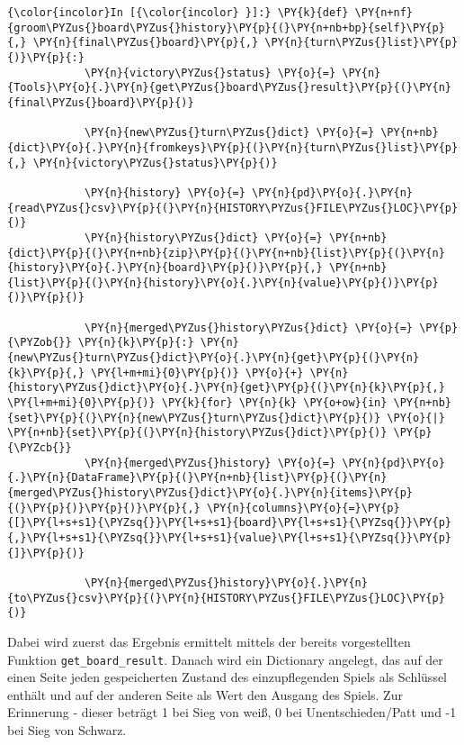     \begin{Verbatim}[commandchars=\\\{\}]
{\color{incolor}In [{\color{incolor} }]:} \PY{k}{def} \PY{n+nf}{groom\PYZus{}board\PYZus{}history}\PY{p}{(}\PY{n+nb+bp}{self}\PY{p}{,} \PY{n}{final\PYZus{}board}\PY{p}{,} \PY{n}{turn\PYZus{}list}\PY{p}{)}\PY{p}{:}
            \PY{n}{victory\PYZus{}status} \PY{o}{=} \PY{n}{Tools}\PY{o}{.}\PY{n}{get\PYZus{}board\PYZus{}result}\PY{p}{(}\PY{n}{final\PYZus{}board}\PY{p}{)}
        
            \PY{n}{new\PYZus{}turn\PYZus{}dict} \PY{o}{=} \PY{n+nb}{dict}\PY{o}{.}\PY{n}{fromkeys}\PY{p}{(}\PY{n}{turn\PYZus{}list}\PY{p}{,} \PY{n}{victory\PYZus{}status}\PY{p}{)}
        
            \PY{n}{history} \PY{o}{=} \PY{n}{pd}\PY{o}{.}\PY{n}{read\PYZus{}csv}\PY{p}{(}\PY{n}{HISTORY\PYZus{}FILE\PYZus{}LOC}\PY{p}{)}
            \PY{n}{history\PYZus{}dict} \PY{o}{=} \PY{n+nb}{dict}\PY{p}{(}\PY{n+nb}{zip}\PY{p}{(}\PY{n+nb}{list}\PY{p}{(}\PY{n}{history}\PY{o}{.}\PY{n}{board}\PY{p}{)}\PY{p}{,} \PY{n+nb}{list}\PY{p}{(}\PY{n}{history}\PY{o}{.}\PY{n}{value}\PY{p}{)}\PY{p}{)}\PY{p}{)}
        
            \PY{n}{merged\PYZus{}history\PYZus{}dict} \PY{o}{=} \PY{p}{\PYZob{}} \PY{n}{k}\PY{p}{:} \PY{n}{new\PYZus{}turn\PYZus{}dict}\PY{o}{.}\PY{n}{get}\PY{p}{(}\PY{n}{k}\PY{p}{,} \PY{l+m+mi}{0}\PY{p}{)} \PY{o}{+} \PY{n}{history\PYZus{}dict}\PY{o}{.}\PY{n}{get}\PY{p}{(}\PY{n}{k}\PY{p}{,} \PY{l+m+mi}{0}\PY{p}{)} \PY{k}{for} \PY{n}{k} \PY{o+ow}{in} \PY{n+nb}{set}\PY{p}{(}\PY{n}{new\PYZus{}turn\PYZus{}dict}\PY{p}{)} \PY{o}{|} \PY{n+nb}{set}\PY{p}{(}\PY{n}{history\PYZus{}dict}\PY{p}{)} \PY{p}{\PYZcb{}}
            \PY{n}{merged\PYZus{}history} \PY{o}{=} \PY{n}{pd}\PY{o}{.}\PY{n}{DataFrame}\PY{p}{(}\PY{n+nb}{list}\PY{p}{(}\PY{n}{merged\PYZus{}history\PYZus{}dict}\PY{o}{.}\PY{n}{items}\PY{p}{(}\PY{p}{)}\PY{p}{)}\PY{p}{,} \PY{n}{columns}\PY{o}{=}\PY{p}{[}\PY{l+s+s1}{\PYZsq{}}\PY{l+s+s1}{board}\PY{l+s+s1}{\PYZsq{}}\PY{p}{,}\PY{l+s+s1}{\PYZsq{}}\PY{l+s+s1}{value}\PY{l+s+s1}{\PYZsq{}}\PY{p}{]}\PY{p}{)}
        
            \PY{n}{merged\PYZus{}history}\PY{o}{.}\PY{n}{to\PYZus{}csv}\PY{p}{(}\PY{n}{HISTORY\PYZus{}FILE\PYZus{}LOC}\PY{p}{)}
\end{Verbatim}

    Dabei wird zuerst das Ergebnis ermittelt mittels der bereits
vorgestellten Funktion \texttt{get\_board\_result}. Danach wird ein
Dictionary angelegt, das auf der einen Seite jeden gespeicherten Zustand
des einzupflegenden Spiels als Schlüssel enthält und auf der anderen
Seite als Wert den Ausgang des Spiels. Zur Erinnerung - dieser beträgt 1
bei Sieg von weiß, 0 bei Unentschieden/Patt und -1 bei Sieg von Schwarz.

